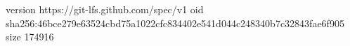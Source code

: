 version https://git-lfs.github.com/spec/v1
oid sha256:46bce279e63524cbd75a1022cfc834402e541d044c248340b7c32843fae6f905
size 174916
